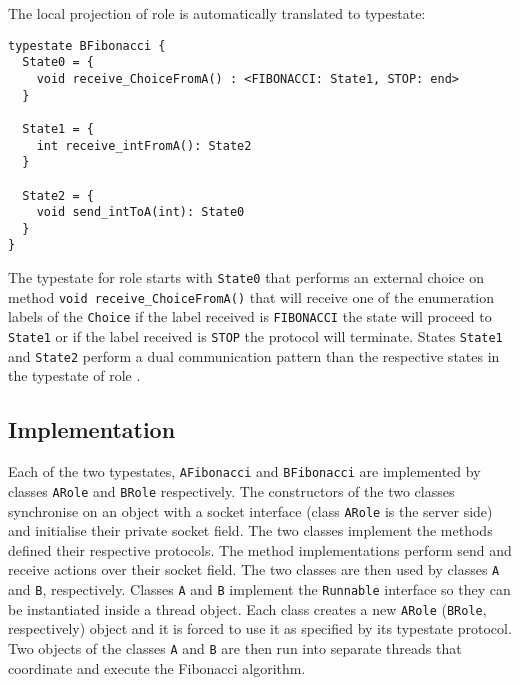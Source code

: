 The local projection of role \B is automatically translated to typestate:

\begin{lstlisting}[caption={Typestate for Role \B}]
typestate BFibonacci {
  State0 = {
    void receive_ChoiceFromA() : <FIBONACCI: State1, STOP: end>
  }

  State1 = {
    int receive_intFromA(): State2
  }

  State2 = {
    void send_intToA(int): State0
  }
}
\end{lstlisting}

The typestate for role \B starts with \lstinline|State0|
that performs an external choice on method
\lstinline|void receive_ChoiceFromA()| that will receive
one of the enumeration labels of the \lstinline|Choice|
if the label received is \lstinline|FIBONACCI| the state
will proceed to \lstinline|State1| or if the label
received is \lstinline|STOP| the protocol will terminate.
States \lstinline|State1| and \lstinline|State2| perform
a dual communication pattern than the respective states
in the typestate of role \A.


\subsection{\Mungo Implementation}

Each of the two typestates, \lstinline|AFibonacci| and
\lstinline|BFibonacci| are implemented by classes
\lstinline|ARole| and \lstinline|BRole| respectively.
The constructors of the two classes synchronise
on an object with a socket interface (class \lstinline|ARole|
is the server side) and initialise their private socket
field.
The two classes implement
the methods defined their respective protocols. The
method implementations perform send and receive actions
over their socket field. The two classes are then
used by classes \lstinline|A| and \lstinline|B|, respectively.
Classes \lstinline|A| and \lstinline|B| implement the \lstinline|Runnable|
interface so they can be instantiated inside a thread object.
Each class creates a new \lstinline|ARole| (\lstinline|BRole|, respectively)
object and it is forced to use it as specified by its typestate
protocol.
Two objects of the classes \lstinline|A| and \lstinline|B| are
then run into separate threads that coordinate and execute the
Fibonacci algorithm.

